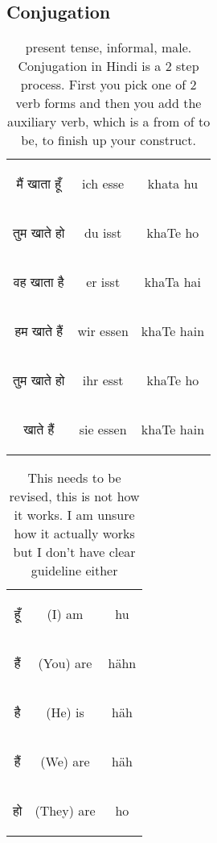 \documentclass[12pt]{scrartcl}
\begin{document}
\subsection{Conjugation}
\begin{table}[H]    \centering
    \begin{tabular}{c|c|c}
    \begin{hindi}मैं खाता हूँ  \end{hindi} & ich esse & khata hu \\   
    \begin{hindi}तुम खाते हो \end{hindi} & du isst & khaTe ho \\   
    \begin{hindi}वह खाता है \end{hindi} & er isst & khaTa hai \\   
    \begin{hindi}हम  खाते हैं \end{hindi} & wir essen & khaTe hain \\   
    \begin{hindi} तुम खाते हो \end{hindi} & ihr esst & khaTe ho \\   
    \begin{hindi} खाते हैं \end{hindi} & sie essen & khaTe hain \\   
    \end{tabular}
    \caption{present tense, informal, male. Conjugation in Hindi is a 2 step process. First you pick one of 2 verb forms and then you add the auxiliary verb, which is a from of to be, to finish up your construct. }    
    \label{tab:my_label}
\end{table}




\begin{table}[H]    \centering
    \begin{tabular}{c|c|c}
    \begin{hindi} हूँ \end{hindi} & (I) am & hu \\   
    \begin{hindi} हैं \end{hindi} & (You) are & hähn \\   
    \begin{hindi} है \end{hindi} & (He) is & häh \\   
    \begin{hindi} हैं \end{hindi} & (We) are & häh \\   
    \begin{hindi} हो \end{hindi} & (They) are & ho \\   
    \end{tabular}
    \caption{This needs to be revised, this is not how it works. I am unsure how it actually works but I don't have clear guideline either} \label{tab:my_label}
\end{table}
\end{document}
